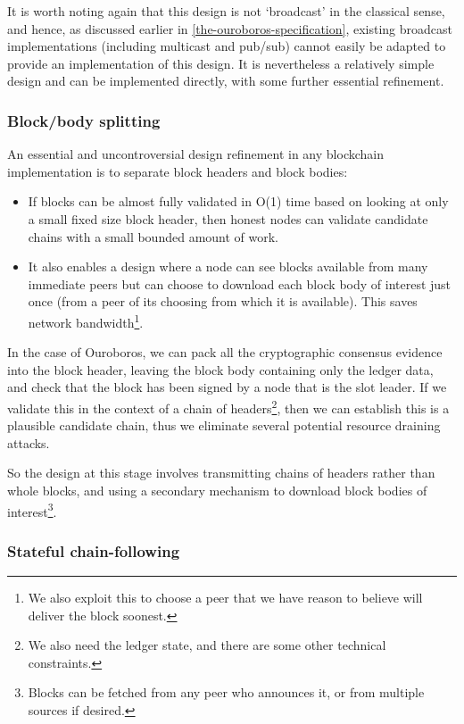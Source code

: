 \documentclass[11pt,a4paper]{article}
\begin{document}
It is worth noting again that this design is not `broadcast' in the
classical sense, and hence, as discussed earlier in
\cref{the-ouroboros-specification},
existing broadcast implementations (including multicast and pub/sub)
cannot easily be adapted to provide an implementation of this design. It
is nevertheless a relatively simple design and can be implemented
directly, with some further essential refinement.

\subsubsection{Block/body splitting}
\label{blockbody-splitting}

An essential and uncontroversial design refinement in any blockchain
implementation is to separate block headers and block bodies:

\begin{itemize}
\item
  If blocks can be almost fully validated in O(1) time based on looking
  at only a small fixed size block header, then honest nodes can
  validate candidate chains with a small bounded amount of work.
\item
  It also enables a design where a node can see blocks available from
  many immediate peers but can choose to download each block body of
  interest just once (from a peer of its choosing from which it is
  available). This saves network bandwidth\footnote{We also exploit this
    to choose a peer that we have reason to believe will deliver the
    block soonest.}.
\end{itemize}

In the case of Ouroboros, we can pack all the cryptographic consensus
evidence into the block header, leaving the block body containing only
the ledger data, and check that the block has been signed by a node that
is the slot leader. If we validate this in the context of a chain of
headers\footnote{We also need the ledger state, and there are some other
  technical constraints.}, then we can establish this is a plausible
candidate chain, thus we eliminate several potential resource draining
attacks.

So the design at this stage involves transmitting chains of headers
rather than whole blocks, and using a secondary mechanism to download
block bodies of interest\footnote{Blocks can be fetched from any peer
  who announces it, or from multiple sources if desired.}.

\subsubsection{Stateful chain-following}
\label{stateful-chain-following}
\end{document}
